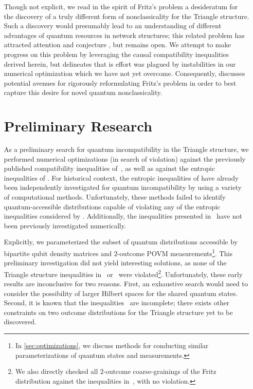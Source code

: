 \documentclass[aps, 10pt, english, twoside, pra, nofootinbib, tightenlines, longbibliography, superscriptaddress]{revtex4-1}
\begin{document}
    Though not explicit, we read in the spirit of Fritz's problem a desideratum for the discovery of a truly different form of nonclassicality for the Triangle structure. Such a discovery would presumably lead to an understanding of different advantages of quantum resources in network structures; this related problem has attracted attention and conjecture \cite{Gisin_2017}, but remains open. We attempt to make progress on this problem by leveraging the causal compatibility inequalities derived herein, but  delineates that is effort was plagued by instabilities in our numerical optimization which we have not yet overcome. Consequently,  discusses potential avenues for rigorously reformulating Fritz's problem in order to best capture this desire for novel quantum nonclassicality.

    \section{Preliminary Research}
    \label{sec:preliminary_research}

    As a preliminary search for quantum incompatibility in the Triangle structure, we performed numerical optimizations (in search of violation) against the previously published compatibility inequalities of~\citet{Inflation}, as well as against the entropic inequalities of \citet{Henson_2014}. For historical context, the entropic inequalities of \cite{Henson_2014} have already been independently investigated for quantum incompatibility by \citet{Weilenmann_2016} using a variety of computational methods. Unfortunately, these methods failed to identify quantum-accessible distributions capable of violating any of the entropic inequalities considered by \cite{Weilenmann_2016}. Additionally, the inequalities presented in~\cite{Inflation} have not been previously investigated numerically.

    Explicitly, we parameterized the subset of quantum distributions accessible by bipartite qubit density matrices and $2$-outcome POVM measurements\footnote{In \cref{sec:optimizations}, we discuss methods for conducting similar parameterizations of quantum states and measurements.}. This preliminary investigation did not yield interesting solutions, as none of the Triangle structure inequalities in~\cite{Inflation} or~\cite{Henson_2014} were violated\footnote{We also directly checked all 2-outcome coarse-grainings of the Fritz distribution against the inequalities in~\cite{Inflation,Henson_2014}, with no violation.}. Unfortunately, these early results are inconclusive for two reasons. First, an exhaustive search would need to consider the possibility of larger Hilbert spaces for the shared quantum states. Second, it is known that the inequalities~\cite{Inflation} are incomplete; there exists other constraints on two outcome distributions for the Triangle structure yet to be discovered.
\end{document}
